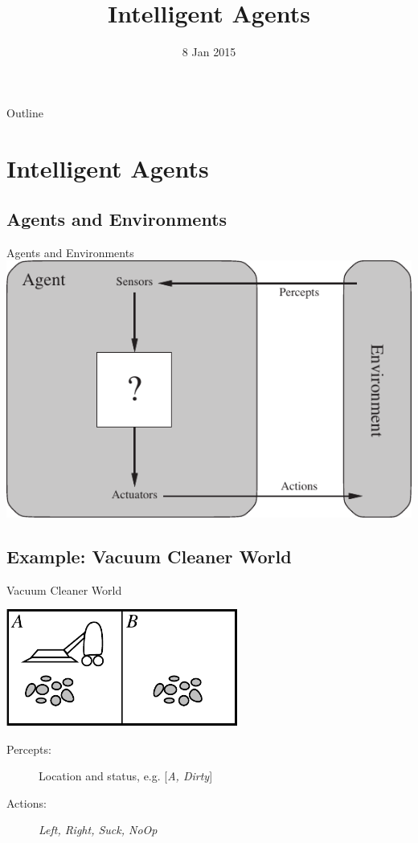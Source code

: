\documentclass[14pt]{beamer}
\title{Intelligent Agents}
\date[]{8 Jan 2015}
\begin{document}
\begin{frame}
  \titlepage
\end{frame}

\begin{frame}{Outline}
  \tableofcontents
\end{frame}

\section{Intelligent Agents}
\subsection{Agents and Environments}

\begin{frame}{Agents and Environments}
\includegraphics[width=\textwidth]{agent-environment.pdf}
\end{frame}

\subsection{Example: Vacuum Cleaner World}

\begin{frame}{Vacuum Cleaner World}
\begin{center}
\includegraphics[width=3in]{vacuum-environment.pdf}
\end{center}
\begin{description}
\item[Percepts:] Location and status, e.g. [\textit{A, Dirty}]
\item[Actions:] \textit{Left, Right, Suck, NoOp}
\end{description}
\end{frame}
\end{document}
